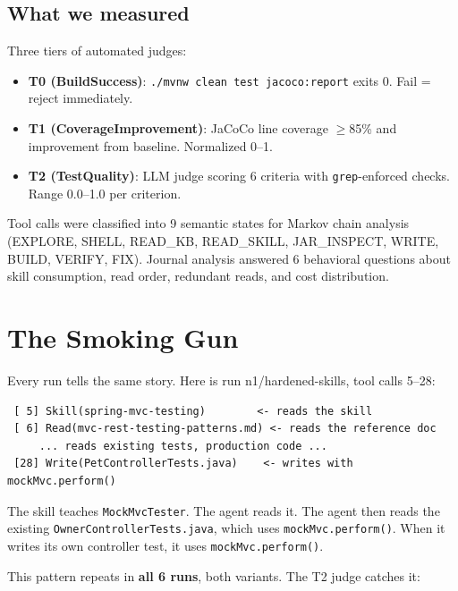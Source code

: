 \documentclass[11pt,a4paper]{article}
\begin{document}
\subsection*{What we measured}

Three tiers of automated judges:

\begin{itemize}
  \item \textbf{T0 (BuildSuccess)}: \texttt{./mvnw clean test jacoco:report} exits 0.
    Fail = reject immediately.
  \item \textbf{T1 (CoverageImprovement)}: JaCoCo line coverage $\geq$85\%
    and improvement from baseline. Normalized 0--1.
  \item \textbf{T2 (TestQuality)}: LLM judge scoring 6 criteria with \texttt{grep}-enforced
    checks. Range 0.0--1.0 per criterion.
\end{itemize}

Tool calls were classified into 9 semantic states for Markov chain analysis
(EXPLORE, SHELL, READ\_KB, READ\_SKILL, JAR\_INSPECT, WRITE, BUILD, VERIFY, FIX).
Journal analysis answered 6 behavioral questions about skill consumption, read order,
redundant reads, and cost distribution.

\section{The Smoking Gun}
\label{sec:smoking-gun}

Every run tells the same story. Here is run n1/hardened-skills, tool calls 5--28:

\begin{codebox}
\begin{verbatim}
 [ 5] Skill(spring-mvc-testing)        <- reads the skill
 [ 6] Read(mvc-rest-testing-patterns.md) <- reads the reference doc
     ... reads existing tests, production code ...
 [28] Write(PetControllerTests.java)    <- writes with mockMvc.perform()
\end{verbatim}
\end{codebox}

The skill teaches \texttt{MockMvcTester}. The agent reads it.
The agent then reads the existing \texttt{OwnerControllerTests.java},
which uses \texttt{mockMvc.perform()}.
When it writes its own controller test, it uses \texttt{mockMvc.perform()}.

This pattern repeats in \textbf{all 6 runs}, both variants.
The T2 judge catches it:
\end{document}
